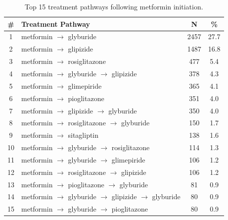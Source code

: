 \documentclass[twoside,11pt]{article}
\begin{document}
\begin{table}[H]
  \centering
  \begin{tabular}{clcc}
    \hline
    \textbf{\#} & \textbf{Treatment Pathway}                                                        & \textbf{N} & \textbf{\%} \\
    \hline
    1           & metformin $\rightarrow$ glyburide                                                 & 2457       & 27.7        \\
    2           & metformin $\rightarrow$ glipizide                                                 & 1487       & 16.8        \\
    3           & metformin $\rightarrow$ rosiglitazone                                             & 477        & 5.4         \\
    4           & metformin $\rightarrow$ glyburide $\rightarrow$ glipizide                         & 378        & 4.3         \\
    5           & metformin $\rightarrow$ glimepiride                                               & 365        & 4.1         \\
    6           & metformin $\rightarrow$ pioglitazone                                              & 351        & 4.0         \\
    7           & metformin $\rightarrow$ glipizide $\rightarrow$ glyburide                         & 350        & 4.0         \\
    8           & metformin $\rightarrow$ rosiglitazone $\rightarrow$ glyburide                     & 150        & 1.7         \\
    9           & metformin $\rightarrow$ sitagliptin                                               & 138        & 1.6         \\
    10          & metformin $\rightarrow$ glyburide $\rightarrow$ rosiglitazone                     & 114        & 1.3         \\
    11          & metformin $\rightarrow$ glyburide $\rightarrow$ glimepiride                       & 106        & 1.2         \\
    12          & metformin $\rightarrow$ rosiglitazone $\rightarrow$ glipizide                     & 106        & 1.2         \\
    13          & metformin $\rightarrow$ pioglitazone $\rightarrow$ glyburide                      & 81         & 0.9         \\
    14          & metformin $\rightarrow$ glyburide $\rightarrow$ glipizide $\rightarrow$ glyburide & 80         & 0.9         \\
    15          & metformin $\rightarrow$ glyburide $\rightarrow$ pioglitazone                      & 80         & 0.9         \\
    \hline
  \end{tabular}
  \caption{Top 15 treatment pathways following metformin initiation.}
  \label{tab:top_pathways}
\end{table}
\end{document}
